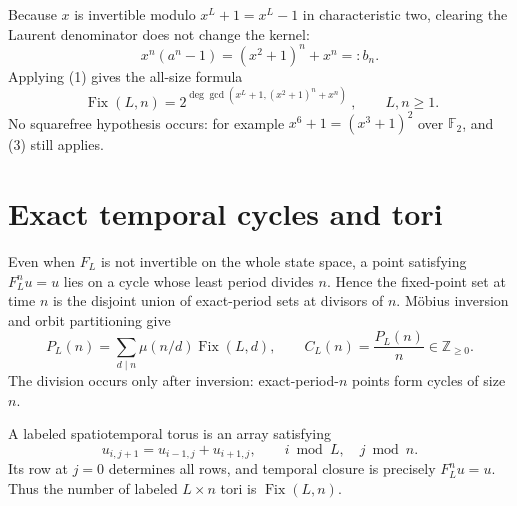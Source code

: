 \documentclass[10pt]{article}
\begin{document}
Because $x$ is invertible modulo $x^L+1=x^L-1$ in characteristic two,
clearing the Laurent denominator does not change the kernel:
\begin{equation}
x^n(a^n-1)=(x^2+1)^n+x^n=:b_n.                                  \tag{2}
\end{equation}
Applying (1) gives the all-size formula
\begin{equation}
\boxed{\ \operatorname{Fix}(L,n)
=2^{\deg\gcd(x^L+1,(x^2+1)^n+x^n)}\ },\qquad L,n\geq1.           \tag{3}
\end{equation}
No squarefree hypothesis occurs: for example
$x^6+1=(x^3+1)^2$ over $\mathbb F_2$, and (3) still applies.

\section{Exact temporal cycles and tori}
Even when $F_L$ is not invertible on the whole state space, a point satisfying
$F_L^nu=u$ lies on a cycle whose least period divides $n$.  Hence the
fixed-point set at time $n$ is the disjoint union of exact-period sets at
divisors of $n$.  M\"obius inversion and orbit partitioning give
\begin{equation}
P_L(n)=\sum_{d\mid n}\mu(n/d)\operatorname{Fix}(L,d),
\qquad C_L(n)=\frac{P_L(n)}{n}\in\mathbb Z_{\geq0}.               \tag{4}
\end{equation}
The division occurs only after inversion: exact-period-$n$ points form cycles
of size $n$.

A labeled spatiotemporal torus is an array satisfying
\[
u_{i,j+1}=u_{i-1,j}+u_{i+1,j},\qquad i\bmod L,\quad j\bmod n.
\]
Its row at $j=0$ determines all rows, and temporal closure is precisely
$F_L^nu=u$.  Thus the number of labeled $L\times n$ tori is
$\operatorname{Fix}(L,n)$.
\end{document}
